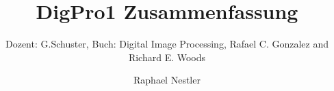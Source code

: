 \documentclass{scrartcl}
\title{DigPro1 Zusammenfassung}
\subtitle{Dozent: G.Schuster, Buch: Digital Image Processing, Rafael C. Gonzalez and Richard E. Woods}
\author{Raphael Nestler}
\numberwithin{equation}{section}
\begin{document}
\begin{titlepage}
	\maketitle
	\thispagestyle{empty}
\end{titlepage}
\newpage

\tableofcontents
\newpage
\twocolumn






\end{document}

